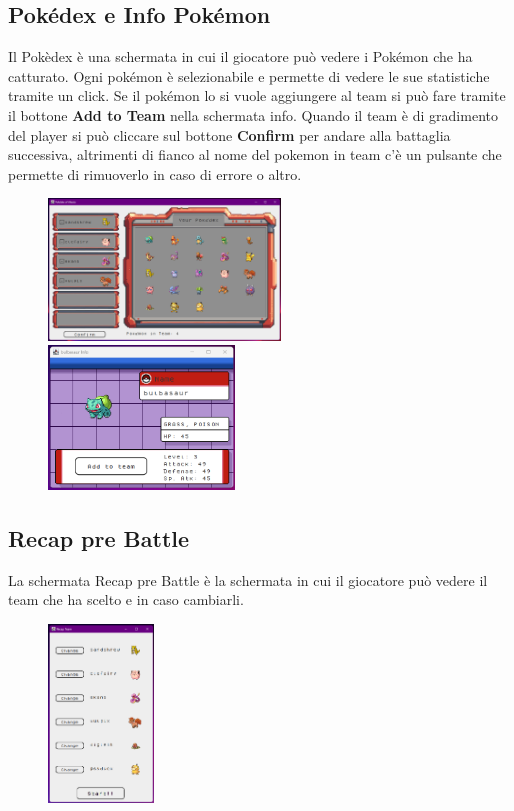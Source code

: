 \documentclass[12pt]{article}
\begin{document}
\subsection{Pokédex e Info Pokémon}
Il Pokèdex è una schermata in cui il giocatore può vedere i Pokémon che ha catturato. Ogni pokémon è selezionabile e permette di vedere le sue statistiche tramite un click.
Se il pokémon lo si vuole aggiungere al team si può fare tramite il bottone \textbf{Add to Team} nella schermata info. Quando il team è di gradimento del player si può cliccare sul bottone \textbf{Confirm} per andare alla battaglia successiva,
altrimenti di fianco al nome del pokemon in team c'è un pulsante che permette di rimuoverlo in caso di errore o altro.
\begin{figure}[h]
    \centering
    \includegraphics[width=0.55\textwidth]{Images/pokedex.png}
    \includegraphics[width=0.44\textwidth]{Images/infopoke.png}
\end{figure}
\newpage
\subsection{Recap pre Battle}
La schermata Recap pre Battle è la schermata in cui il giocatore può vedere il team che ha scelto e in caso cambiarli.
\begin{figure}[h]
    \centering
    \includegraphics[width=0.25\textwidth]{Images/recapinfo.png}
\end{figure}
\end{document}

